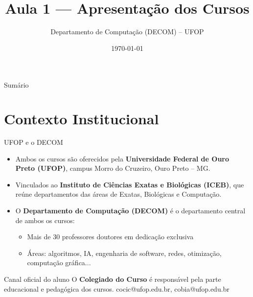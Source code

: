 \documentclass[aspectratio=169]{beamer}
\title{Aula 1 --- Apresentação dos Cursos}
\author{Departamento de Computação (DECOM) -- UFOP}
\date{\today}
\newcommand{\impt}[1]{\textcolor{morange}{\textbf{#1}}}
\begin{document}
\begin{frame}[plain]
  \titlepage
\end{frame}

\begin{frame}{Sumário}
  \tableofcontents
\end{frame}

\section{Contexto Institucional}

\begin{frame}{UFOP e o DECOM}
  \begin{itemize}
    \item Ambos os cursos são oferecidos pela \textbf{Universidade Federal de Ouro Preto (UFOP)}, campus Morro do Cruzeiro, Ouro Preto -- MG.
    \item Vinculados ao \textbf{Instituto de Ciências Exatas e Biológicas (ICEB)}, que reúne departamentos das áreas de Exatas, Biológicas e Computação.
    \item O \impt{Departamento de Computação (DECOM)} é o departamento central de ambos os cursos:
    \begin{itemize}
      \item Mais de 30 professores doutores em dedicação exclusiva
      \item Áreas: algoritmos, IA, engenharia de software, redes, otimização, computação gráfica...
    \end{itemize}
  \end{itemize}
  \begin{block}{Canal oficial do aluno}
    O \textbf{Colegiado do Curso} é responsável pela parte educacional e pedagógica dos cursos.
    \centering
    cocic@ufop.edu.br, cobia@ufop.edu.br
  \end{block}
\end{frame}

\end{document}
